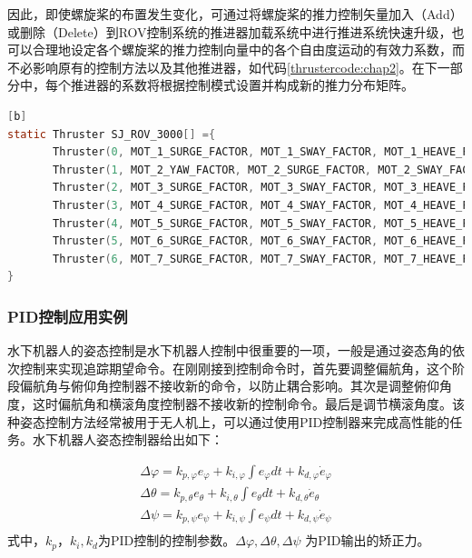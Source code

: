 因此，即使螺旋桨的布置发生变化，可通过将螺旋桨的推力控制矢量加入（Add）或删除（Delete）到ROV控制系统的推进器加载系统中进行推进系统快速升级，也可以合理地设定各个螺旋桨的推力控制向量中的各个自由度运动的有效力系数，而不必影响原有的控制方法以及其他推进器，如代码\ref{thrustercode:chap2}。在下一部分中，每个推进器的系数将根据控制模式设置并构成新的推力分布矩阵。\\

\begin{lstlisting}[language={C}, caption={ROV的推力布置示例\label{thrustercode:chap2}}][b]
static Thruster SJ_ROV_3000[] ={
       Thruster(0, MOT_1_SURGE_FACTOR, MOT_1_SWAY_FACTOR, MOT_1_HEAVE_FACTOR, MOT_1_ROLL_FACTOR, MOT_1_PITCH_FACTOR, MOT_1_YAW_FACTOR),
       Thruster(1, MOT_2_YAW_FACTOR, MOT_2_SURGE_FACTOR, MOT_2_SWAY_FACTOR, MOT_2_HEAVE_FACTOR, MOT_2_ROLL_FACTOR, MOT_2_PITCH_FACTOR),
       Thruster(2, MOT_3_SURGE_FACTOR, MOT_3_SWAY_FACTOR, MOT_3_HEAVE_FACTOR, MOT_3_ROLL_FACTOR, MOT_3_PITCH_FACTOR, MOT_3_YAW_FACTOR),
       Thruster(3, MOT_4_SURGE_FACTOR, MOT_4_SWAY_FACTOR, MOT_4_HEAVE_FACTOR, MOT_4_ROLL_FACTOR, MOT_4_PITCH_FACTOR, MOT_4_YAW_FACTOR),
       Thruster(4, MOT_5_SURGE_FACTOR, MOT_5_SWAY_FACTOR, MOT_5_HEAVE_FACTOR, MOT_5_ROLL_FACTOR, MOT_5_PITCH_FACTOR, MOT_5_YAW_FACTOR),
       Thruster(5, MOT_6_SURGE_FACTOR, MOT_6_SWAY_FACTOR, MOT_6_HEAVE_FACTOR, MOT_6_ROLL_FACTOR, MOT_6_PITCH_FACTOR, MOT_6_YAW_FACTOR),
       Thruster(6, MOT_7_SURGE_FACTOR, MOT_7_SWAY_FACTOR, MOT_7_HEAVE_FACTOR, MOT_7_ROLL_FACTOR, MOT_7_PITCH_FACTOR, MOT_7_YAW_FACTOR)
}
\end{lstlisting}

\subsubsection{PID控制应用实例 }
水下机器人的姿态控制是水下机器人控制中很重要的一项，一般是通过姿态角的依次控制来实现追踪期望命令。在刚刚接到控制命令时，首先要调整偏航角，这个阶段偏航角与俯仰角控制器不接收新的命令，以防止耦合影响。其次是调整俯仰角度，这时偏航角和横滚角度控制器不接收新的控制命令。最后是调节横滚角度。该种姿态控制方法经常被用于无人机上，可以通过使用PID控制器来完成高性能的任务\cite{mellinger2012trajectory}。水下机器人姿态控制器给出如下：

\begin{equation}
\label{eq:11}
\begin{array}{l}
 \Delta \varphi  = {k_{p,\varphi }}{e_\varphi } + {k_{i,\varphi }}\int {{e_\varphi }dt}  + {k_{d,\varphi }}{{\dot e}_\varphi } \\
 \Delta \theta  = {k_{p,\theta }}{e_\theta } + {k_{i,\theta }}\int {{e_\theta }dt}  + {k_{d,\theta }}{{\dot e}_\theta } \\
 \Delta \psi  = {k_{p,\psi }}{e_\psi } + {k_{i,\psi }}\int {{e_\psi }dt}  + {k_{d,\psi }}{{\dot e}_\psi } \\
 \end{array}
\end{equation}
式中，$k_p，k_i, k_d$为PID控制的控制参数。$\Delta \varphi, \Delta \theta, \Delta \psi$ 为PID输出的矫正力。

